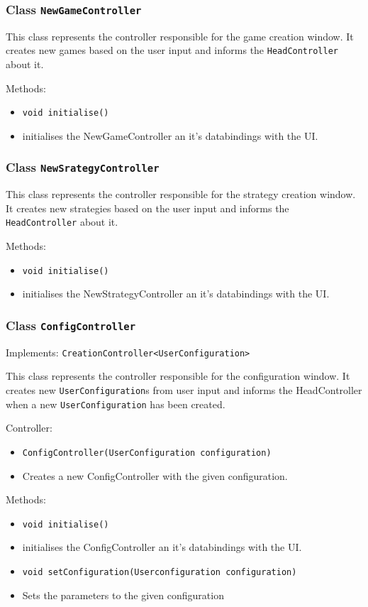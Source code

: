 \documentclass[parskip=full,11pt]{scrartcl}
\begin{document}
\subsubsection{Class \texttt{NewGameController}}
This class represents the controller responsible for the game creation window.
It creates new games based on the user input and informs the \texttt{HeadController} about it.

Methods:
\begin{itemize}\itemsep -10pt
\item \texttt{void initialise()}
\item[] initialises the NewGameController an it's databindings with the UI.
\end{itemize}

\subsubsection{Class \texttt{NewSrategyController}}
This class represents the controller responsible for the strategy creation window. It creates new strategies based on the user input and informs the \texttt{HeadController} about it.

Methods:
\begin{itemize}\itemsep -10pt
\item \texttt{void initialise()}
\item[] initialises the NewStrategyController an it's databindings with the UI.
\end{itemize}

\subsubsection{Class \texttt{ConfigController}}

Implements: \texttt{CreationController<UserConfiguration>}

This class represents the controller responsible for the configuration window. It creates new \texttt{UserConfiguration}s from user input and informs the HeadController when a new \texttt{UserConfiguration} has been created.

Controller:
\begin{itemize}\itemsep -10pt
\item \texttt{ConfigController(UserConfiguration configuration)}
\item[] Creates a new ConfigController with the given configuration.
\end{itemize}

Methods:
\begin{itemize}\itemsep -10pt
\item \texttt{void initialise()}
\item[] initialises the ConfigController an it's databindings with the UI.

\item \texttt{void setConfiguration(Userconfiguration configuration)}
\item[] Sets the parameters to the given configuration

\end{itemize}
\end{document}
